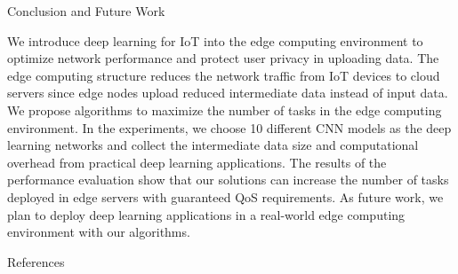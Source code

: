 \documentclass[final]{beamer}
\newlength{\onecolwid}
\begin{document}
\begin{frame}
\begin{columns}[t]
\begin{column}{\onecolwid} %


\begin{exampleblock}{Conclusion and Future Work}

We introduce deep learning for IoT into the edge computing environment to optimize network performance and protect user privacy in uploading data. The edge computing structure reduces the network traffic from IoT devices to cloud servers since edge nodes upload reduced intermediate data instead of input data. We propose algorithms to maximize the number of tasks in the edge computing environment. In the experiments, we choose 10 different CNN models as the deep learning networks and collect the intermediate data size and computational overhead from practical deep learning applications. The results of the performance evaluation show that our solutions can increase the number of tasks deployed in edge servers with guaranteed QoS requirements. As future work, we plan to deploy deep learning applications in a real-world edge computing environment with our algorithms.

\end{exampleblock}






\begin{exampleblock}{References}


\end{exampleblock}
\end{column}
\end{columns}
\end{frame}
\end{document}
